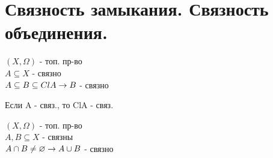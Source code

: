 \documentclass[geometry.tex]{subfiles}
\begin{document}
  \section{Связность замыкания. Связность объединения.}

  \begin{theorem}
      $(X, \Omega)$ - топ. пр-во\\
      $A \subseteq X$ - связно\\
      $A \subseteq B \subseteq Cl A\\ \rightarrow B$ - связно
  \end{theorem}

  \begin{theorem}
      Если A - связ., то ClA - связ.
  \end{theorem}

  \begin{theorem}
      $(X, \Omega)$ - топ. пр-во\\
      $A, B \subseteq X$ - связны\\
      $A \cap B \neq \varnothing\\ \rightarrow A \cup B $ - связно
  \end{theorem}
\end{document}
